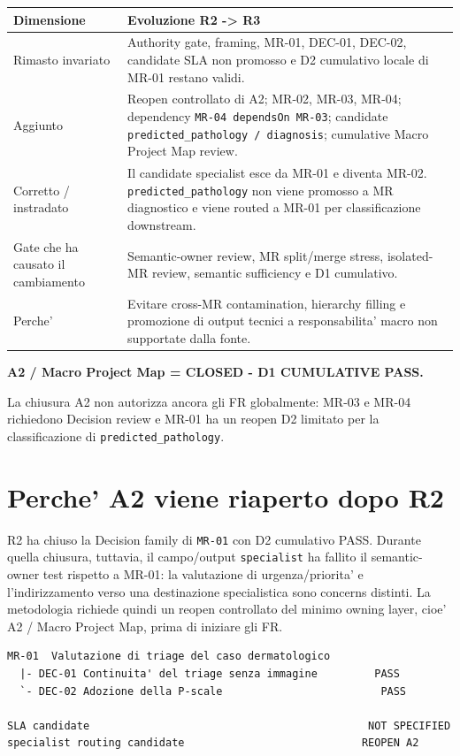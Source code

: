 \documentclass[11pt,a4paper]{article}
\begin{document}
\begin{tabularx}{\textwidth}{L{42mm}Y}
\toprule
\textbf{Dimensione} & \textbf{Evoluzione R2 -> R3} \\
\midrule
Rimasto invariato & Authority gate, framing, MR-01, DEC-01, DEC-02, candidate SLA non promosso e D2 cumulativo locale di MR-01 restano validi. \\
Aggiunto & Reopen controllato di A2; MR-02, MR-03, MR-04; dependency \texttt{MR-04 dependsOn MR-03}; candidate \texttt{predicted\_pathology / diagnosis}; cumulative Macro Project Map review. \\
Corretto / instradato & Il candidate specialist esce da MR-01 e diventa MR-02. \texttt{predicted\_pathology} non viene promosso a MR diagnostico e viene routed a MR-01 per classificazione downstream. \\
Gate che ha causato il cambiamento & Semantic-owner review, MR split/merge stress, isolated-MR review, semantic sufficiency e D1 cumulativo. \\
Perche' & Evitare cross-MR contamination, hierarchy filling e promozione di output tecnici a responsabilita' macro non supportate dalla fonte. \\
\bottomrule
\end{tabularx}

\begin{ddtacore}[title={Milestone R3}]
\textbf{A2 / Macro Project Map = CLOSED - D1 CUMULATIVE PASS.}

La chiusura A2 non autorizza ancora gli FR globalmente: MR-03 e MR-04 richiedono Decision review e MR-01 ha un reopen D2 limitato per la classificazione di \texttt{predicted\_pathology}.
\end{ddtacore}

\section{Perche' A2 viene riaperto dopo R2}

R2 ha chiuso la Decision family di \texttt{MR-01} con D2 cumulativo PASS. Durante quella chiusura, tuttavia, il campo/output \texttt{specialist} ha fallito il semantic-owner test rispetto a MR-01: la valutazione di urgenza/priorita' e l'indirizzamento verso una destinazione specialistica sono concerns distinti. La metodologia richiede quindi un reopen controllato del minimo owning layer, cioe' A2 / Macro Project Map, prima di iniziare gli FR.

\begin{ddtacore}[title={Stato ereditato da R2}]
\begin{lstlisting}
MR-01  Valutazione di triage del caso dermatologico
  |- DEC-01 Continuita' del triage senza immagine         PASS
  `- DEC-02 Adozione della P-scale                         PASS

SLA candidate                                            NOT SPECIFIED
specialist routing candidate                            REOPEN A2
\end{lstlisting}
\end{ddtacore}
\end{document}
